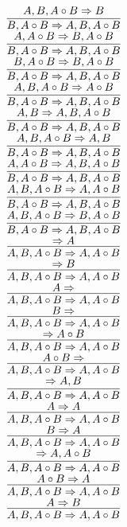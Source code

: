 \documentclass[11pt]{article}
\begin{document}
\begin{center}
\bigskip
\\$\infer{B, A\circ B\Rightarrow A, B, A\circ B}{A, B, A\circ B\Rightarrow B}$
\bigskip
\\$\infer{B, A\circ B\Rightarrow A, B, A\circ B}{A, A\circ B\Rightarrow B, A\circ B}$
\bigskip
\\$\infer{B, A\circ B\Rightarrow A, B, A\circ B}{B, A\circ B\Rightarrow B, A\circ B}$
\bigskip
\\$\infer{B, A\circ B\Rightarrow A, B, A\circ B}{A, B, A\circ B\Rightarrow A\circ B}$
\bigskip
\\$\infer{B, A\circ B\Rightarrow A, B, A\circ B}{A, B\Rightarrow A, B, A\circ B}$
\bigskip
\\$\infer{B, A\circ B\Rightarrow A, B, A\circ B}{A, B, A\circ B\Rightarrow A, B}$
\bigskip
\\$\infer{B, A\circ B\Rightarrow A, B, A\circ B}{A, A\circ B\Rightarrow A, B, A\circ B}$
\bigskip
\\$\infer{B, A\circ B\Rightarrow A, B, A\circ B}{A, B, A\circ B\Rightarrow A, A\circ B}$
\bigskip
\\$\infer{B, A\circ B\Rightarrow A, B, A\circ B}{A, B, A\circ B\Rightarrow B, A\circ B}$
\bigskip
\\$\infer{A, B, A\circ B\Rightarrow A, A\circ B}{\Rightarrow A}$
\bigskip
\\$\infer{A, B, A\circ B\Rightarrow A, A\circ B}{\Rightarrow B}$
\bigskip
\\$\infer{A, B, A\circ B\Rightarrow A, A\circ B}{A\Rightarrow }$
\bigskip
\\$\infer{A, B, A\circ B\Rightarrow A, A\circ B}{B\Rightarrow }$
\bigskip
\\$\infer{A, B, A\circ B\Rightarrow A, A\circ B}{\Rightarrow A\circ B}$
\bigskip
\\$\infer{A, B, A\circ B\Rightarrow A, A\circ B}{A\circ B\Rightarrow }$
\bigskip
\\$\infer{A, B, A\circ B\Rightarrow A, A\circ B}{\Rightarrow A, B}$
\bigskip
\\$\infer{A, B, A\circ B\Rightarrow A, A\circ B}{A\Rightarrow A}$
\bigskip
\\$\infer{A, B, A\circ B\Rightarrow A, A\circ B}{B\Rightarrow A}$
\bigskip
\\$\infer{A, B, A\circ B\Rightarrow A, A\circ B}{\Rightarrow A, A\circ B}$
\bigskip
\\$\infer{A, B, A\circ B\Rightarrow A, A\circ B}{A\circ B\Rightarrow A}$
\bigskip
\\$\infer{A, B, A\circ B\Rightarrow A, A\circ B}{A\Rightarrow B}$

\end{center}
\end{document}
